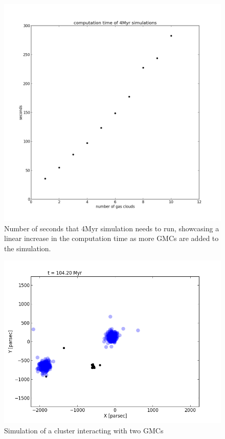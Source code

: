 \documentclass{aa}
\begin{document}
\begin{figure}
    \centering
    \includegraphics[width=\hsize]{img/multi_gmc_timings.png}
    \caption{Number of seconds that 4Myr simulation needs to run, showcasing a linear increase in the computation time as more GMCs are added to the simulation.}\label{fig:multi_GMCs_timings}
\end{figure}
\begin{figure}
    \centering
    \includegraphics[width=\hsize]{img/two_gmcs_sim.png}
    \caption{Simulation of a cluster interacting with two GMCs}\label{fig:two_GMCs}
\end{figure}
\end{document}
